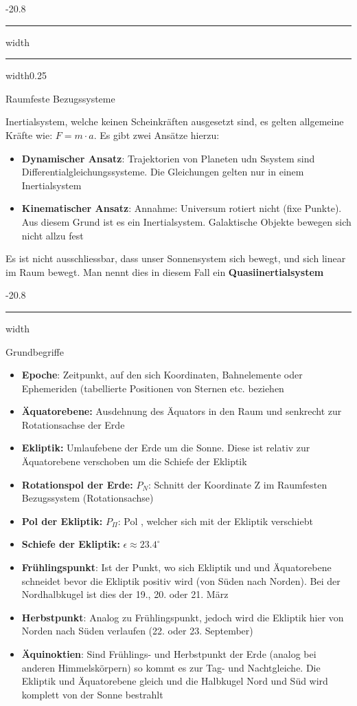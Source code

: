 \documentclass[8pt, landscape, fleqn]{scrartcl}
\makeatletter
\renewcommand{\subsection}{\@startsection{subsection}{1}{0mm}%
{-2\baselineskip}{0.8\baselineskip}%
{\hrule depth 0.2pt width\columnwidth\hrule depth0.75pt
width0.25\columnwidth\vspace*{1.2em}\large\bfseries\rmfamily}}
\renewcommand{\subsubsection}{\@startsection{subsubsection}{1}{0mm}%
{-2\baselineskip}{0.8\baselineskip}%
{\hrule depth 0.2pt width\columnwidth\vspace*{1.2em}\normalsize\bfseries\rmfamily}}
\makeatother
\begin{document}
\begin{multicols*}{3}
\subsection{Raumfeste Bezugssysteme}

Inertialsystem, welche keinen Scheinkräften ausgesetzt sind, es gelten allgemeine Kräfte wie: $F = m\cdot a$. Es gibt zwei Ansätze hierzu:

\begin{itemize}
    \item \textbf{Dynamischer Ansatz}: Trajektorien von Planeten udn Ssystem sind Differentialgleichungssysteme. Die Gleichungen gelten nur in einem Inertialsystem
    \item \textbf{Kinematischer Ansatz}: Annahme: Universum rotiert nicht (fixe Punkte). Aus diesem Grund ist es ein Inertialsystem. Galaktische Objekte bewegen sich nicht allzu fest
\end{itemize}

Es ist nicht ausschliessbar, dass unser Sonnensystem sich bewegt, und sich linear im Raum bewegt. Man nennt dies in diesem Fall ein \textbf{Quasiinertialsystem}

\subsubsection{Grundbegriffe}
\begin{itemize}
    \item \textbf{Epoche}: Zeitpunkt, auf den sich Koordinaten, Bahnelemente oder Ephemeriden (tabellierte Positionen von Sternen etc. beziehen
    \item \textbf{Äquatorebene:} Ausdehnung des Äquators in den Raum und senkrecht zur Rotationsachse der Erde
    \item \textbf{Ekliptik:} Umlaufebene der Erde um die Sonne. Diese ist relativ zur Äquatorebene verschoben um die Schiefe der Ekliptik
    \item \textbf{Rotationspol der Erde:} $P_N$: Schnitt der Koordinate Z im Raumfesten Bezugssystem (Rotationsachse)
    \item \textbf{Pol der Ekliptik:} $P_\Pi$: Pol , welcher sich mit der Ekliptik verschiebt
    \item \textbf{Schiefe der Ekliptik:} $\epsilon \approx 23.4^{\circ}$
    \item \textbf{Frühlingspunkt}: Ist der Punkt, wo sich Ekliptik und und Äquatorebene schneidet bevor die Ekliptik positiv wird (von Süden nach Norden). Bei der Nordhalbkugel ist dies der 19., 20. oder 21. März
    \item \textbf{Herbstpunkt}: Analog zu Frühlingspunkt, jedoch wird die Ekliptik hier von Norden nach Süden verlaufen (22. oder 23. September)
    \item \textbf{Äquinoktien}: Sind Frühlings- und Herbstpunkt der Erde (analog bei anderen Himmelskörpern) so kommt es zur Tag- und Nachtgleiche. Die Ekliptik und Äquatorebene gleich und die Halbkugel Nord und Süd wird komplett von der Sonne bestrahlt
\end{itemize}


\end{multicols*}
\end{document}
